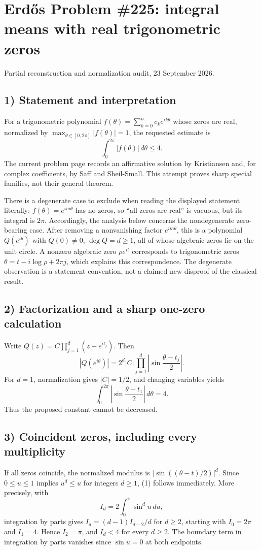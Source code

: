 \section{Erd\H{o}s Problem \#225: integral means with real trigonometric zeros}
\noindent Partial reconstruction and normalization audit, 23 September 2026.

\subsection*{1) Statement and interpretation}
For a trigonometric polynomial $f(\theta)=\sum_{k=0}^n c_ke^{ik\theta}$ whose zeros are real, normalized by $\max_{\theta\in[0,2\pi]}|f(\theta)|=1$, the requested estimate is
\[
 \int_0^{2\pi}|f(\theta)|\,d\theta\le4.\tag{1}
\]
The current problem page records an affirmative solution by Kristiansen and, for complex coefficients, by Saff and Sheil-Small. This attempt proves sharp special families, not their general theorem.

There is a degenerate case to exclude when reading the displayed statement literally: $f(\theta)=e^{im\theta}$ has no zeros, so ``all zeros are real'' is vacuous, but its integral is $2\pi$. Accordingly, the analysis below concerns the nondegenerate zero-bearing case. After removing a nonvanishing factor $e^{im\theta}$, this is a polynomial $Q(e^{i\theta})$ with $Q(0)\ne0$, $\deg Q=d\ge1$, all of whose algebraic zeros lie on the unit circle. A nonzero algebraic zero $\rho e^{it}$ corresponds to trigonometric zeros $\theta=t-i\log\rho+2\pi j$, which explains this correspondence. The degenerate observation is a statement convention, not a claimed new disproof of the classical result.

\subsection*{2) Factorization and a sharp one-zero calculation}
Write $Q(z)=C\prod_{j=1}^d(z-e^{it_j})$. Then
\[
 |Q(e^{i\theta})|=2^d|C|\prod_{j=1}^d\left|\sin\frac{\theta-t_j}{2}\right|.\tag{2}
\]
For $d=1$, normalization gives $|C|=1/2$, and changing variables yields
\[
 \int_0^{2\pi}\left|\sin\frac{\theta-t_1}{2}\right|\,d\theta=4.
\]
Thus the proposed constant cannot be decreased.

\subsection*{3) Coincident zeros, including every multiplicity}
If all zeros coincide, the normalized modulus is $|\sin((\theta-t)/2)|^d$. Since $0\le u\le1$ implies $u^d\le u$ for integers $d\ge1$, (1) follows immediately. More precisely, with
\[
 I_d=2\int_0^\pi\sin^d u\,du,
\]
integration by parts gives $I_d=(d-1)I_{d-2}/d$ for $d\ge2$, starting with $I_0=2\pi$ and $I_1=4$. Hence $I_2=\pi$, and $I_d<4$ for every $d\ge2$. The boundary term in integration by parts vanishes since $\sin u=0$ at both endpoints.

